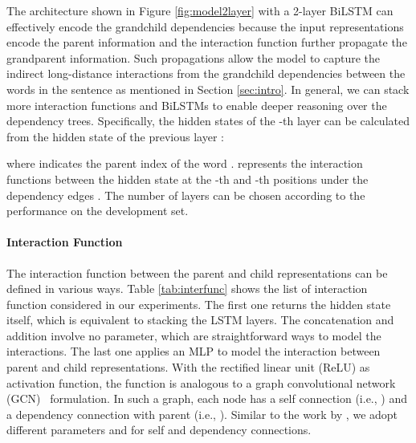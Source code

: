 \documentclass[11pt,a4paper]{article}
\begin{document}
The architecture shown in Figure \ref{fig:model2layer} with a 2-layer BiLSTM can effectively encode the grandchild dependencies because the input representations encode the parent information and the interaction function further propagate the grandparent information. 
Such propagations allow the model to capture the indirect long-distance interactions from the grandchild dependencies between the words in the sentence as mentioned in Section \ref{sec:intro}. 
In general, we can stack more interaction functions and BiLSTMs to enable deeper reasoning over the dependency trees. 
Specifically, the hidden states of the -th layer  can be calculated from the hidden state of the previous layer :

where  indicates the parent index of the word . 
 represents the interaction functions between the hidden state at the -th and  -th positions under the dependency edges . 
The number of layers  can be chosen according to the performance on the development set. 

\begin{table}[t!]
	\centering
\caption{List of interaction functions.}
\label{tab:interfunc}
\end{table}

\paragraph{Interaction Function}
The interaction function between the parent and child representations can be defined in various ways. 
Table \ref{tab:interfunc} shows the list of interaction function considered in our experiments. 
The first one returns the hidden state itself, which is equivalent to stacking the LSTM layers. 
The concatenation and addition involve no parameter, which are straightforward ways to model the interactions. 
The last one applies an MLP to model the interaction between parent and child representations. 
With the rectified linear unit (ReLU) as activation function, the  function is analogous to a graph convolutional network (GCN)~\cite{kipf2017semi} formulation. 
In such a graph, each node has a self connection (i.e., ) and a dependency connection with parent (i.e., ).  
Similar to the work by \citet{marcheggiani2017encoding}, we adopt different parameters  and  for self and dependency connections. 
\end{document}
